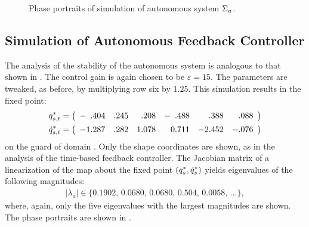 \begin{figure*}[tp!]
  \centering
  \caption{Phase portraits of simulation of autonomous system $\Sigma_{a}$.}
  \label{fig:pp-a}
\end{figure*} 

\subsection{Simulation of Autonomous Feedback Controller}
The analysis of the stability of the autonomous system is analogous to that
shown in .
%
The control gain is again chosen to be $\varepsilon = 15$.
%
The parameters are tweaked, as before, by multiplying row six by $1.25$.
%
This simulation results in the fixed point:
%
\begin{align*}
  q^{*}_{s,t} &=
  \left(\begin{array}{r r r r r r}
      -\hphantom{1}.404 & .245 & \hphantom{1}.208 & -\hphantom{0}.488 &
      \hphantom{-2}.388 & \hphantom{-}.088
  \end{array}\right)\\
  \dot{q}^{*}_{s,t} &=
  \left(\begin{array}{r r r r r r}
    -1.287 & .282 & 1.078 & \hphantom{-}0.711 & -2.452 & -.076
  \end{array}\right)
\end{align*}
on the guard of domain {\DC}.
%
Only the shape coordinates are shown, as in the analysis of the time-based
feedback controller.
%
The Jacobian matrix of a linearization of the \Poincare{} map about the fixed
point $(q^{*}_{s}, \dot{q}^{*}_{s})$ yields eigenvalues of the following
magnitudes:
\begin{align*}
  |\lambda_{a}| \in \{0.1902, \, 0.0680, \, 0.0680, \, 0.504, \, 0.0058, \,
  \ldots\},
\end{align*}
where, again, only the five eigenvalues with the largest magnitudes are shown.
%
The phase portraits are shown in .
